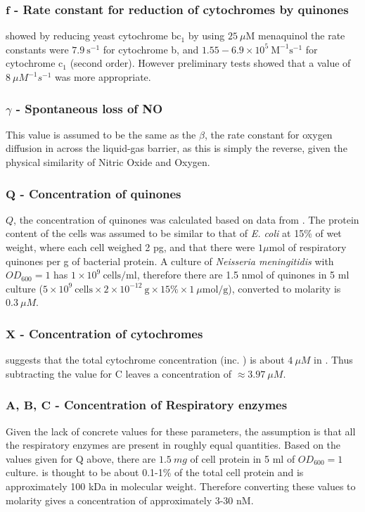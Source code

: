 \subsubsection*{$\mathbf{f}$ {\bf- Rate constant for reduction of cytochromes by quinones}}
\citet{Snyder2000} showed by reducing yeast cytochrome $\mathrm{bc}_1$ by using $25~\mu\mathrm{M}$ menaquinol the rate constants were $7.9~\mathrm{s}^{-1}$ for cytochrome b, and $1.55-6.9\times10^5~\mathrm{M}^{-1}\mathrm{s}^{-1}$ for cytochrome $\mathrm{c}_1$ (second order). However preliminary tests showed that a value of $8~\mu M^{-1}s^{-1}$ was more appropriate.

\subsubsection*{$\gamma$ {\bf- Spontaneous loss of NO}}
This value is assumed to be the same as the $\beta$, the rate constant for oxygen diffusion in across the liquid-gas barrier, as this is simply the reverse, given the physical similarity of Nitric Oxide and Oxygen.

\subsubsection*{$\mathbf{Q}$ {\bf- Concentration of quinones}}
$Q$, the concentration of quinones was calculated based on data from \citet{Hedrick1986}. The protein content of the cells was assumed to be similar to that of \textit{E. coli} at 15\% of wet weight, where each cell weighed 2 pg, and that there were $1\mu \textrm{mol}$ of respiratory quinones per g of bacterial protein\cite{Hollaender1977}. A culture of \textit{Neisseria meningitidis} with $OD_{600} = 1$ has $1 \times 10^9~\textrm{cells/ml}$, therefore there are 1.5 nmol of quinones in 5 ml culture ($5\times 10^9~\textrm{cells} \times 2\times 10^{-12}~\textrm{g} \times 15\% \times 1~\mu\textrm{mol/g}$), converted to molarity is $0.3~\mu M$.

\subsubsection*{$\mathbf{X}$ {\bf- Concentration of cytochromes}}
\citet{Deeudom2007} suggests that the total cytochrome concentration (inc. \cbbthree{}) is about $4~\mu M$ in \Nsm{}. Thus subtracting the value for C leaves a concentration of $\approx 3.97~\mu M$.

\subsubsection*{$\mathbf{A}$, $\mathbf{B}$, $\mathbf{C}$ {\bf- Concentration of Respiratory enzymes}}
Given the lack of concrete values for these parameters, the assumption is that all the respiratory enzymes are present in roughly equal quantities. Based on the values given for Q above, there are $1.5~mg$ of cell protein in 5 ml of $OD_{600}=1$ culture. \cbbthree{} is thought to be about 0.1-1\% of the total cell protein
and is approximately 100 kDa in molecular weight. Therefore converting these values to molarity gives a concentration of approximately 3-30 nM.

